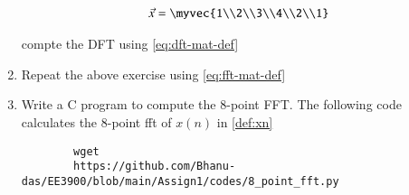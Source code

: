 \documentclass[journal,12pt,twocolumn]{IEEEtran}
\renewcommand\thesection{\arabic{section}}
\begin{document}
\begin{enumerate}[label=\arabic*.,ref=\thesection.\theenumi]
	
	\begin{align}
		\vec{x} = \myvec{1\\2\\3\\4\\2\\1}
		\label{eq:equation1}
	\end{align}

	compte the DFT using 
	\eqref{eq:dft-mat-def}
	
	
	
	\item Repeat the above exercise using
	\eqref{eq:fft-mat-def}
	\item Write a C program to compute the 8-point FFT. 
	\solution The following code calculates the 8-point fft of $x(n)$ in \ref{def:xn}
	\begin{lstlisting}
		wget
		https://github.com/Bhanu-das/EE3900/blob/main/Assign1/codes/8_point_fft.py
	\end{lstlisting}
	
\end{enumerate}
\end{document}
